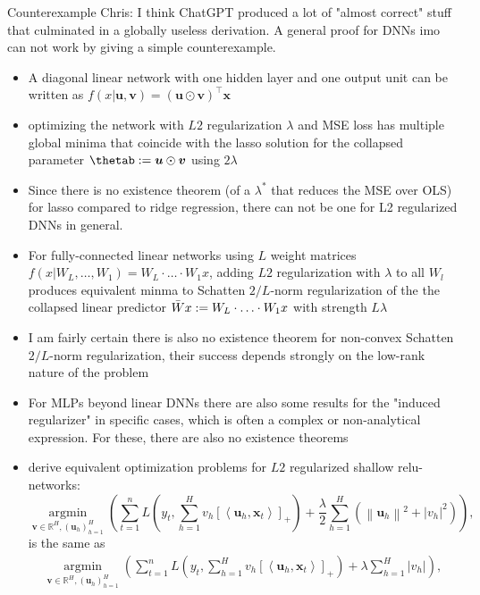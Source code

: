 \documentclass[11pt,compress,t,notes=noshow, xcolor=table]{beamer}
\begin{document}
\begin{vbframe}{Counterexample}
Chris: I think ChatGPT produced a lot of "almost correct" stuff that culminated in a globally useless derivation. A general proof for DNNs imo can not work by giving a simple counterexample.
\vspace{0.2cm}
\begin{itemize}
    \item A diagonal linear network with one hidden layer and one output unit can be written as $f(x|\bm{u},\bm{v}) = (\bm{u} \odot \bm{v})^{\top} \bm{x}$
    \item optimizing the network with $L2$ regularization $\lambda$ and MSE loss has multiple global minima that coincide with the lasso solution for the collapsed parameter $\thetab:=\bm{u}\odot \bm{v}$ using $2\lambda$
    \item Since there is no existence theorem (of a $\lambda^*$ that reduces the MSE over OLS) for lasso compared to ridge regression, there can not be one for L2 regularized DNNs in general.
    \item For fully-connected linear networks using $L$ weight matrices $f(x|W_L,\ldots,W_1)=W_L \cdot \ldots \cdot W_1 x$, adding $L2$ regularization with $\lambda$ to all $W_l$ produces equivalent minma to Schatten $2/L$-norm regularization of the the collapsed linear predictor $\Bar{W}x:=W_L \cdot \ldots \cdot W_1x$ with strength $L\lambda$
    \item I am fairly certain there is also no existence theorem for non-convex Schatten $2/L$-norm regularization, their success depends strongly on the low-rank nature of the problem
    \item For MLPs beyond linear DNNs there are also some results for the "induced regularizer" in specific cases, which is often a complex or non-analytical expression. For these, there are also no existence theorems
    \item {} derive equivalent optimization problems for $L2$ regularized shallow relu-networks:
    $$
\underset{\boldsymbol{v} \in \mathbb{R}^H,\left(\boldsymbol{u}_h\right)_{h=1}^H}{\operatorname{argmin}}\left(\sum_{t=1}^n L\left(y_t, \sum_{h=1}^H v_h\left[\left\langle\boldsymbol{u}_h, \boldsymbol{x}_t\right\rangle\right]_{+}\right)+\frac{\lambda}{2} \sum_{h=1}^H\left(\left\|\boldsymbol{u}_h\right\|^2+\left|v_h\right|^2\right)\right),
$$
is the same as
$$
\begin{gathered}
\underset{\boldsymbol{v} \in \mathbb{R}^H,\left(\boldsymbol{u}_h\right)_{h=1}^H}{\operatorname{argmin}}\left(\sum_{t=1}^n L\left(y_t, \sum_{h=1}^H v_h\left[\left\langle\boldsymbol{u}_h, \boldsymbol{x}_t\right\rangle\right]_{+}\right)+\lambda \sum_{h=1}^H\left|v_h\right|\right), \\

\end{gathered}$$
\end{itemize}
\end{vbframe}
\end{document}
